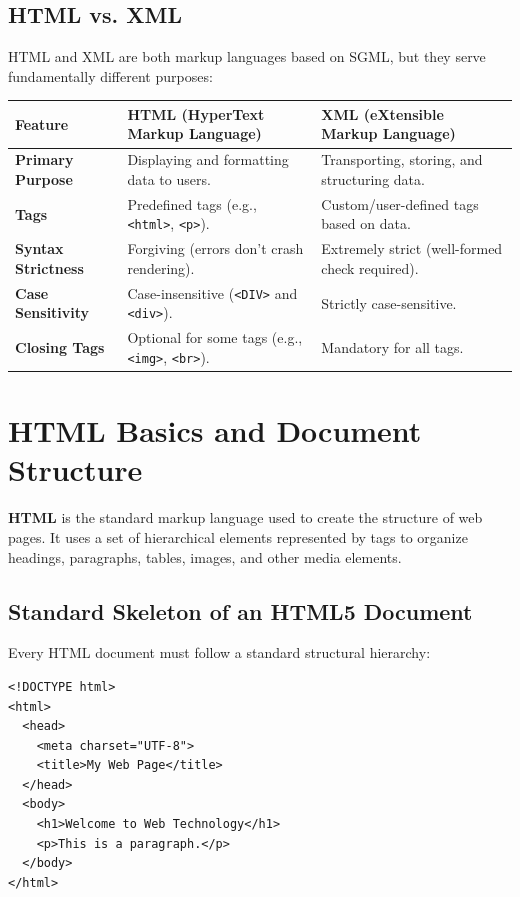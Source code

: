 \documentclass[12pt,a4paper]{article}
\renewcommand{\arraystretch}{1.45}
\begin{document}
\subsection{HTML vs. XML}
HTML and XML are both markup languages based on SGML, but they serve fundamentally different purposes:

\par\noindent
{\renewcommand{\arraystretch}{1.5}%
\begin{tabularx}{\linewidth}{|B{3.5cm}|Y|Y|}
\hline
\textbf{Feature} & \textbf{HTML (HyperText Markup Language)} & \textbf{XML (eXtensible Markup Language)} \\
\hline
\textbf{Primary Purpose} & Displaying and formatting data to users. & Transporting, storing, and structuring data. \\
\hline
\textbf{Tags} & Predefined tags (e.g., \texttt{<html>}, \texttt{<p>}). & Custom/user-defined tags based on data. \\
\hline
\textbf{Syntax Strictness} & Forgiving (errors don't crash rendering). & Extremely strict (well-formed check required). \\
\hline
\textbf{Case Sensitivity} & Case-insensitive (\texttt{<DIV>} and \texttt{<div>}). & Strictly case-sensitive. \\
\hline
\textbf{Closing Tags} & Optional for some tags (e.g., \texttt{<img>}, \texttt{<br>}). & Mandatory for all tags. \\
\hline
\end{tabularx}}

\section{HTML Basics and Document Structure}

\begin{tcolorbox}[defbox, title={\textbf{HTML --- HyperText Markup Language}}]
\textbf{HTML} is the standard markup language used to create the structure of web pages. It uses a set of hierarchical elements represented by tags to organize headings, paragraphs, tables, images, and other media elements.
\end{tcolorbox}

\subsection{Standard Skeleton of an HTML5 Document}
Every HTML document must follow a standard structural hierarchy:
\begin{spacing}{1.0}
\begin{verbatim}
<!DOCTYPE html>
<html>
  <head>
    <meta charset="UTF-8">
    <title>My Web Page</title>
  </head>
  <body>
    <h1>Welcome to Web Technology</h1>
    <p>This is a paragraph.</p>
  </body>
</html>
\end{verbatim}
\end{spacing}
\end{document}
